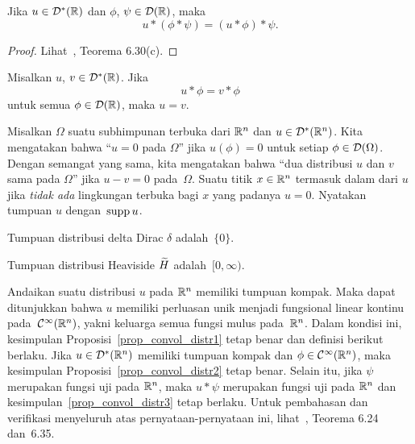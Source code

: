 \begin{prop}\label{prop_convol_distr3} Jika $u \in \mathcal{D}^*(\mathbb{R})$ dan $\phi$, $\psi \in \mathcal{D}(\mathbb{R})$, maka
   \[ u \ast (\phi \ast \psi) = (u \ast \phi) \ast \psi. \]
\end{prop}

\begin{proof} Lihat~\cite{Rudin:1991}, Teorema 6.30(c).  \ns
\end{proof}

\begin{prop} Misalkan $u$, $v \in \mathcal{D}^*(\mathbb{R})$. Jika
   \[ u \ast \phi = v \ast \phi \]
untuk semua $\phi \in \mathcal{D}(\mathbb{R})$, maka $ u = v$.
\end{prop}

\begin{defn} Misalkan $\Omega$ suatu subhimpunan terbuka dari $\mathbb{R}^n$ dan $u \in \mathcal{D}^*(\mathbb{R}^n)$. Kita mengatakan bahwa ``$u = 0$ pada $\Omega$'' jika $u(\phi) = 0$
untuk setiap $\phi \in \mathcal{D}(\Omega)$. Dengan semangat yang sama, kita mengatakan bahwa ``dua distribusi $u$ dan $v$ sama pada $\Omega$'' jika $u - v = 0$
pada~$\Omega$. Suatu titik $x \in \mathbb{R}^n$ termasuk dalam
 dari $u$ jika \emph{tidak ada} lingkungan terbuka bagi $x$ yang padanya $u = 0$. Nyatakan tumpuan $u$ dengan~$\operatorname{supp} u$.
\end{defn}

\begin{exam} Tumpuan distribusi delta Dirac $\delta$ adalah~$\{0\}$.
\end{exam}

\begin{exam} Tumpuan distribusi Heaviside $\widetilde{H}$ adalah~$[0,\infty)$.
\end{exam}

\begin{rem} Andaikan suatu distribusi $u$ pada $\mathbb{R}^n$ memiliki tumpuan kompak. Maka dapat ditunjukkan bahwa $u$ memiliki perluasan unik menjadi
fungsional linear kontinu pada~$\mathcal{C}^\infty(\mathbb{R}^n)$, yakni keluarga semua fungsi mulus pada~$\mathbb{R}^n$. Dalam kondisi ini, kesimpulan
Proposisi~\ref{prop_convol_distr1} tetap benar dan definisi berikut berlaku. Jika $u \in \mathcal{D}^*(\mathbb{R}^n)$ memiliki tumpuan kompak
dan $\phi \in \mathcal{C}^\infty(\mathbb{R}^n)$, maka kesimpulan Proposisi~\ref{prop_convol_distr2} tetap benar. Selain itu, jika $\psi$
merupakan fungsi uji pada $\mathbb{R}^n$, maka $u \ast \psi$ merupakan fungsi uji pada $\mathbb{R}^n$ dan kesimpulan~\ref{prop_convol_distr3} tetap berlaku.
Untuk pembahasan dan verifikasi menyeluruh atas pernyataan-pernyataan ini, lihat~\cite{Rudin:1991}, Teorema 6.24 dan~6.35.
\end{rem}

